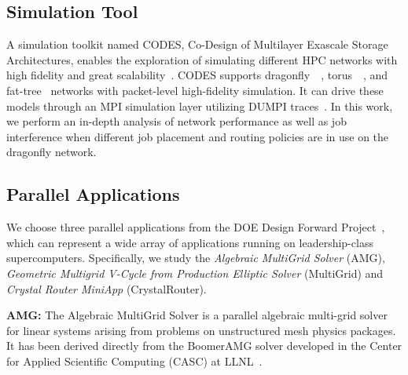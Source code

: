 \documentclass[conference,compsoc]{IEEEtran}
\begin{document}

\subsection{Simulation Tool}
\label{sec:simulation-tool}

A simulation toolkit named CODES, Co-Design of Multilayer Exascale Storage Architectures, enables the exploration of simulating different HPC networks with high fidelity and great scalability~\cite{codes}. CODES supports dragonfly~\cite{codes-dragonfly}~\cite{misbah-tpds}, torus~\cite{misbah-pads-2014}~\cite{ning-pads-2011}, and fat-tree~\cite{ning-pads-2015} networks with packet-level high-fidelity simulation. It can drive these models through an MPI simulation layer utilizing DUMPI traces~\cite{sst}. In this work, we perform an in-depth analysis of network performance as well as job interference when different job placement and routing policies are in use on the dragonfly network.

\subsection{Parallel Applications}
\label{sec: application traces}

We choose three parallel applications from the DOE Design Forward Project~\cite{designforwardwebpage}, which can represent a wide array of applications running on leadership-class supercomputers. Specifically, we study the \emph{Algebraic MultiGrid Solver} (AMG), \emph{Geometric Multigrid V-Cycle from Production Elliptic Solver} (MultiGrid) and \emph{Crystal Router MiniApp} (CrystalRouter). 

\textbf{AMG:} The Algebraic MultiGrid Solver is a parallel algebraic multi-grid solver for linear systems arising from problems on unstructured mesh physics packages. It has been derived directly from the BoomerAMG solver developed in the Center for Applied Scientific Computing (CASC) at LLNL~\cite{amg}. 
\end{document}
